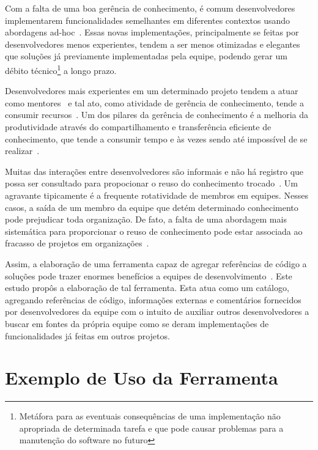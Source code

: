 Com a falta de uma boa gerência de conhecimento, é comum desenvolvedores implementarem funcionalidades semelhantes em diferentes contextos usando abordagens ad-hoc~\cite{SangMok2011}. Essas novas implementações, principalmente se feitas por desenvolvedores menos experientes, tendem a ser menos otimizadas e elegantes que soluções já previamente implementadas pela equipe, podendo gerar um débito técnico\footnote{Metáfora para as eventuais consequências de uma implementação não apropriada de determinada tarefa e que pode causar problemas para a manutenção do software no futuro} a longo prazo.

Desenvolvedores mais experientes em um determinado projeto tendem a atuar como mentores~\cite{CubraniC2004} e tal ato, como atividade de gerência de conhecimento, tende a consumir recursos~\cite{Wiig2003}. Um dos pilares da gerência de conhecimento é a melhoria da produtividade através do compartilhamento e transferência eficiente de conhecimento, que tende a consumir tempo e às vezes sendo até impossível de se realizar~\cite{Levy2009}.

Muitas das interações entre desenvolvedores são informais e não há registro que possa ser consultado para propocionar o reuso do conhecimento trocado~\cite{Olson2000}. Um agravante tipicamente é a frequente rotatividade de membros em equipes. Nesses casos, a saída de um membro da equipe que detém determinado conhecimento pode prejudicar toda organização. De fato, a falta de uma abordagem mais sistemática para proporcionar o reuso de conhecimento pode estar associada ao fracasso de projetos em organizações~\cite{Hall2008}.

Assim, a elaboração de uma ferramenta capaz de agregar referências de código a soluções pode trazer enormes benefícios a equipes de desenvolvimento~\cite{CubraniC2004}. Este estudo propôs a elaboração de tal ferramenta. Esta atua como um catálogo, agregando referências de código, informações externas e comentários fornecidos por desenvolvedores da equipe com o intuito de auxiliar outros desenvolvedores a buscar em fontes da própria equipe como se deram implementações de funcionalidades já feitas em outros projetos.

\section{Exemplo de Uso da Ferramenta}


